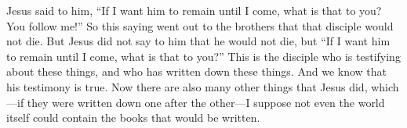 \begin{biblechapter}
\verse Jesus said to him, “If I want him to remain until I come, what is that to you? You follow me!”
\verse So this saying went out to the brothers that that disciple would not die. But Jesus did not say to him that he would not die, but “If I want him to remain until I come, what is that to you?”
 This is the disciple who is testifying about these things, and who has written down these things. And we know that his testimony is true.
\verse Now there are also many other things that Jesus did, which—if they were written down one after the other—I suppose not even the world itself could contain the books that would be written.
\end{biblechapter}

